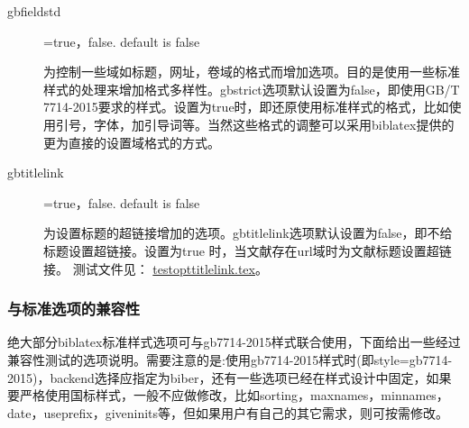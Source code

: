 \begin{description}
  \item[gbfieldstd]=true，false. \hfill default is false

  为控制一些域如标题，网址，卷域的格式而增加选项。目的是使用一些标准样式的处理来增加格式多样性。gbstrict选项默认设置为false，即使用GB/T 7714-2015要求的样式。设置为true时，即还原使用标准样式的格式，比如使用引号，字体，加引导词等。当然这些格式的调整可以采用biblatex提供的更为直接的设置域格式的方式。
  
  \item[gbtitlelink]=true，false. \hfill default is false

  为设置标题的超链接增加的选项。gbtitlelink选项默认设置为false，即不给标题设置超链接。设置为true 时，当文献存在url域时为文献标题设置超链接。
  测试文件见：
  \href{run:example/testopttitlelink.tex}{testopttitlelink.tex}。

\end{description}


\subsubsection{与标准选项的兼容性}
绝大部分biblatex标准样式选项可与gb7714-2015样式联合使用，下面给出一些经过兼容性测试的选项说明。需要注意的是:使用gb7714-2015样式时(即style=gb7714-2015)，backend选择应指定为biber，还有一些选项已经在样式设计中固定，如果要严格使用国标样式，一般不应做修改，比如sorting，maxnames，minnames，date，useprefix，giveninits等，但如果用户有自己的其它需求，则可按需修改。

